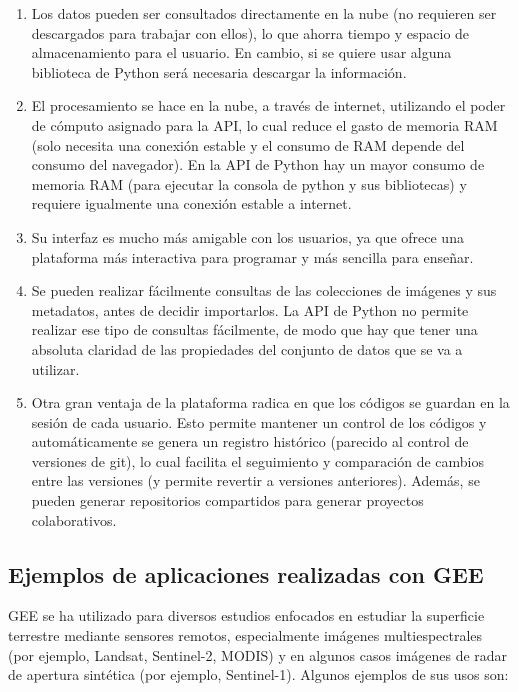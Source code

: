 \documentclass[
  12pt,
  letterpaper,
  twoside]{book}
\providecommand{\tightlist}{%
  \setlength{\itemsep}{0pt}\setlength{\parskip}{0pt}}
\begin{document}
\begin{enumerate}
\def\labelenumi{\arabic{enumi}.}
\tightlist
\item
  Los datos pueden ser consultados directamente en la nube (no requieren ser descargados para trabajar con ellos), lo que ahorra tiempo y espacio de almacenamiento para el usuario. En cambio, si se quiere usar alguna biblioteca de Python será necesaria descargar la información.
\item
  El procesamiento se hace en la nube, a través de internet, utilizando el poder de cómputo asignado para la API, lo cual reduce el gasto de memoria RAM (solo necesita una conexión estable y el consumo de RAM depende del consumo del navegador). En la API de Python hay un mayor consumo de memoria RAM (para ejecutar la consola de python y sus bibliotecas) y requiere igualmente una conexión estable a internet.
\item
  Su interfaz es mucho más amigable con los usuarios, ya que ofrece una plataforma más interactiva para programar y más sencilla para enseñar.
\item
  Se pueden realizar fácilmente consultas de las colecciones de imágenes y sus metadatos, antes de decidir importarlos. La API de Python no permite realizar ese tipo de consultas fácilmente, de modo que hay que tener una absoluta claridad de las propiedades del conjunto de datos que se va a utilizar.
\item
  Otra gran ventaja de la plataforma radica en que los códigos se guardan en la sesión de cada usuario. Esto permite mantener un control de los códigos y automáticamente se genera un registro histórico (parecido al control de versiones de git), lo cual facilita el seguimiento y comparación de cambios entre las versiones (y permite revertir a versiones anteriores). Además, se pueden generar repositorios compartidos para generar proyectos colaborativos.
\end{enumerate}

\hypertarget{ejemplos-de-aplicaciones-realizadas-con-gee}{%
\subsection*{Ejemplos de aplicaciones realizadas con GEE}\label{ejemplos-de-aplicaciones-realizadas-con-gee}}

GEE se ha utilizado para diversos estudios enfocados en estudiar la superficie terrestre mediante sensores remotos, especialmente imágenes multiespectrales (por ejemplo, Landsat, Sentinel-2, MODIS) y en algunos casos imágenes de radar de apertura sintética (por ejemplo, Sentinel-1). Algunos ejemplos de sus usos son:
\end{document}
